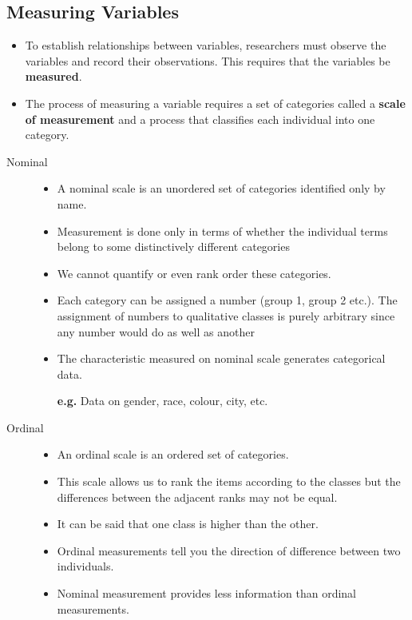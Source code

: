 \documentclass[
10pt, %
a4paper, %
]{report}
\begin{document}
\subsection*{Measuring Variables}
\begin{itemize}
\item To establish relationships between variables, researchers must observe the variables and record their observations. This requires that the variables be \textbf{measured}.
\item The process of measuring a variable requires a set of categories called a \textbf{scale of measurement} and a process that classifies each individual into one category.
\end{itemize}

\begin{description}
\item[Nominal]
\begin{itemize}
\item[]
\item A nominal scale is an unordered set of categories identified only by name.
\item Measurement is done only in terms of whether the individual terms belong to some distinctively different categories
\item We cannot quantify or even rank order these categories.
\item Each category can be assigned a number (group 1, group 2 etc.). The assignment of numbers to qualitative classes is purely arbitrary since any number would do as well as another
\item The characteristic measured on nominal scale generates categorical data.
\item[\textbf{e.g.}] Data on gender, race, colour, city, etc.
\end{itemize}
\item[Ordinal]
\begin{itemize}
\item[]
\item An ordinal scale is an ordered set of categories.
\item This scale allows us to rank the items according to the classes but the differences between the adjacent ranks may not be equal.
\item It can be said that one class is higher than the other.
\item Ordinal measurements tell you the direction of difference between two individuals.
\item Nominal measurement provides less information than ordinal measurements.

\end{itemize}
\end{description}
\end{document}
